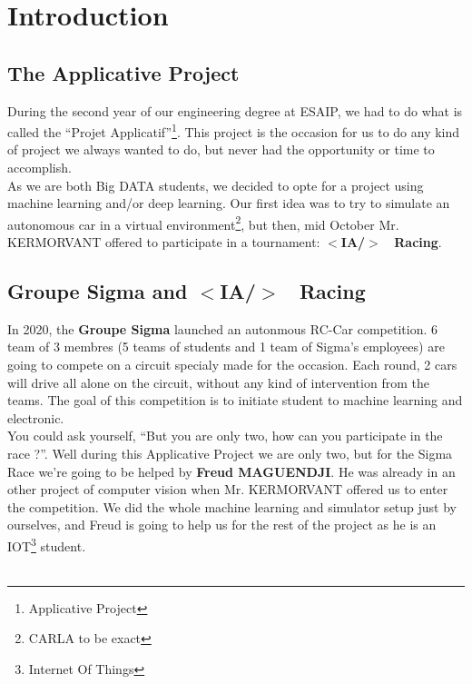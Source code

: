 \setcounter{page}{1}
\section{Introduction}
\subsection*{The Applicative Project}
During the second year of our engineering degree at ESAIP, we had to do what is called the ``Projet Applicatif''\footnote{Applicative Project}. This project is the occasion for us to do any kind of project we always wanted to do, but never had the opportunity or time to accomplish.\\

As we are both Big DATA students, we decided to opte for a project using machine learning and/or deep learning. Our first idea was to try to simulate an autonomous car in a virtual environment\footnote{CARLA to be exact}, but then, mid October Mr. KERMORVANT offered to participate in a tournament: \textbf{$<$IA/$>$ ~Racing}.\\

\subsection*{Groupe Sigma and $<$IA/$>$ ~Racing}
In 2020, the \textbf{Groupe Sigma} launched an autonmous RC-Car competition. %
 6 team of 3 membres (5 teams of students and 1 team of Sigma's employees) are going to compete on a circuit specialy made for the occasion. Each round, 2 cars will drive all alone on the circuit, without any kind of intervention from the teams. The goal of this competition is to initiate student to machine learning and electronic.\\
 
You could ask yourself, ``But you are only two, how can you participate in the race ?''. Well during this Applicative Project we are only two, but for the Sigma Race we're going to be helped by \textbf{Freud MAGUENDJI}. He was already in an other project of computer vision when Mr. KERMORVANT offered us to enter the competition. We did the whole machine learning and simulator setup just by ourselves, and Freud is going to help us for the rest of the project as he is an IOT\footnote{Internet Of Things} student.\\

\hfill \\

\begin{figure}[!h]
	\centering
    \def\svgwidth{0.7\columnwidth}
    
\end{figure}
\clearpage
